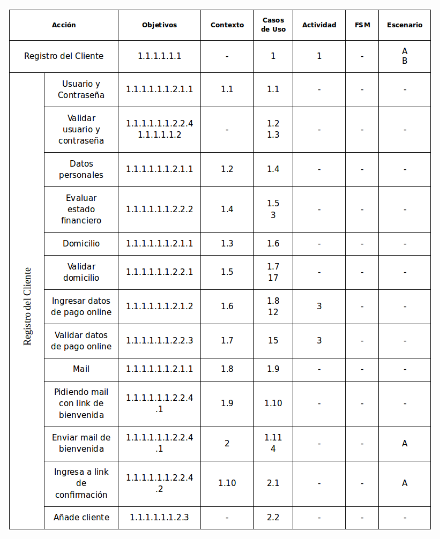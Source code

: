 \begin{figure}[H]
	\begin{center}
	\includegraphics[width=\textwidth]{imagenes/trazabilidad-registro-cliente.png}
	\end{center}
	\label{trazabilidad-registro-cliente}
\end{figure}

